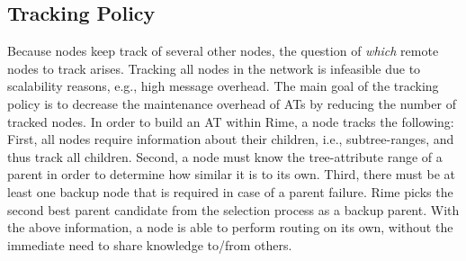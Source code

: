 \subsection{Tracking Policy}
\label{subsec:tracking-policy}
Because nodes keep track of several other nodes, the question of 
\textit{which} remote nodes to track arises. Tracking all nodes in the network is infeasible due to scalability reasons, e.g., high message overhead. The main goal of the tracking policy is to decrease the maintenance overhead of ATs by 
reducing the number of tracked nodes.
In order to build an AT within Rime, a node tracks the following:
First, all nodes require information about their children, i.e., subtree-ranges, and thus track all children. 
Second, a node must know the tree-attribute range of a parent in order to determine how similar it is to its own.
Third, there must be at least one backup node that is required in case of a parent failure. Rime picks the second best parent candidate from the selection process as a backup parent.
With the above information, a node is able to perform routing on its own,
without the immediate need to share knowledge to/from others.

